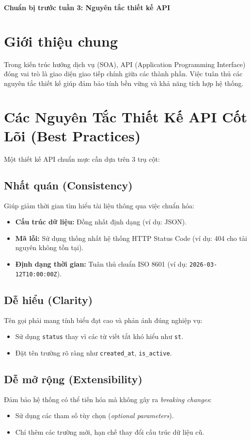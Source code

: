 \documentclass[12pt, a4paper]{article}
\begin{document}
\begin{center}
    \Large \textbf{Chuẩn bị trước tuần 3: Nguyên tắc thiết kế API}
\end{center}

\vspace{0.5cm}

\section{Giới thiệu chung}
Trong kiến trúc hướng dịch vụ (SOA), API (Application Programming Interface) đóng vai trò là giao diện giao tiếp chính giữa các thành phần. Việc tuân thủ các nguyên tắc thiết kế giúp đảm bảo tính bền vững và khả năng tích hợp hệ thống.

\section{Các Nguyên Tắc Thiết Kế API Cốt Lõi (Best Practices)}
Một thiết kế API chuẩn mực cần dựa trên 3 trụ cột:

\subsection{Nhất quán (Consistency)}
Giúp giảm thời gian tìm hiểu tài liệu thông qua việc chuẩn hóa:
\begin{itemize}
    \item \textbf{Cấu trúc dữ liệu:} Đồng nhất định dạng (ví dụ: JSON).
    \item \textbf{Mã lỗi:} Sử dụng thống nhất hệ thống HTTP Status Code (ví dụ: 404 cho tài nguyên không tồn tại).
    \item \textbf{Định dạng thời gian:} Tuân thủ chuẩn ISO 8601 (ví dụ: \texttt{2026-03-12T10:00:00Z}).
\end{itemize}

\subsection{Dễ hiểu (Clarity)}
Tên gọi phải mang tính biểu đạt cao và phản ánh đúng nghiệp vụ:
\begin{itemize}
    \item Sử dụng \texttt{status} thay vì các từ viết tắt khó hiểu như \texttt{st}.
    \item Đặt tên trường rõ ràng như \texttt{created\_at}, \texttt{is\_active}.
\end{itemize}

\subsection{Dễ mở rộng (Extensibility)}
Đảm bảo hệ thống có thể tiến hóa mà không gây ra \textit{breaking changes}:
\begin{itemize}
    \item Sử dụng các tham số tùy chọn (\textit{optional parameters}).
    \item Chỉ thêm các trường mới, hạn chế thay đổi cấu trúc dữ liệu cũ.
\end{itemize}
\end{document}
